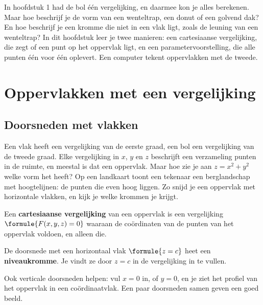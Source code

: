 In hoofdstuk 1 had de bol één vergelijking, en daarmee kon je alles berekenen. Maar hoe beschrijf je de vorm van een wenteltrap, een donut of een golvend dak? En hoe beschrijf je een kromme die niet in een vlak ligt, zoals de leuning van een wenteltrap? In dit hoofdstuk leer je twee manieren: een cartesiaanse vergelijking, die zegt of een punt op het oppervlak ligt, en een parametervoorstelling, die alle punten één voor één oplevert. Een computer tekent oppervlakken met de tweede.

\begin{oefeningen}[Start]

\end{oefeningen}

\section{Oppervlakken met een vergelijking}

\subsection{Doorsneden met vlakken}

Een vlak heeft een vergelijking van de eerste graad, een bol een vergelijking van de tweede graad. Elke vergelijking in $x$, $y$ en $z$ beschrijft een verzameling punten in de ruimte, en meestal is dat een oppervlak. Maar hoe zie je aan $z = x^2 + y^2$ welke vorm het heeft? Op een landkaart toont een tekenaar een berglandschap met hoogtelijnen: de punten die even hoog liggen. Zo snijd je een oppervlak met horizontale vlakken, en kijk je welke krommen je krijgt.

\begin{theorie}
Een \textbf{\textcolor{accent}{cartesiaanse vergelijking}} van een oppervlak is een vergelijking $\formule{F(x, y, z) = 0}$ waaraan de coördinaten van de punten van het oppervlak voldoen, en alleen die.

De doorsnede met een horizontaal vlak $\formule{z = c}$ heet een \textbf{\textcolor{accent}{niveaukromme}}. Je vindt ze door $z = c$ in de vergelijking in te vullen.
\end{theorie}

Ook verticale doorsneden helpen: vul $x = 0$ in, of $y = 0$, en je ziet het profiel van het oppervlak in een coördinaatvlak. Een paar doorsneden samen geven een goed beeld.

